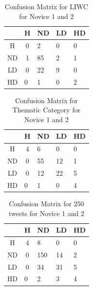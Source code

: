 \documentclass[11pt]{article}
\begin{document}
\begin{table}[h]
\centering
\begin{tabular}{c|c|l|l|l|}
\cline{2-5}
                         & H                       & ND & LD & HD \\ \hline
\multicolumn{1}{|c|}{H}  & 0                       & 2  & 0  & 0  \\ \hline
\multicolumn{1}{|c|}{ND} & 1                       & 85 & 2  & 1  \\ \hline
\multicolumn{1}{|c|}{LD} & 0                       & 22 & 9  & 0  \\ \hline
\multicolumn{1}{|l}{HD}  & \multicolumn{1}{|l|}{0} & 1  & 0  & 2  \\ \hline
\end{tabular}
\caption {Confusion Matrix for LIWC for Novice 1 and 2}
\end{table}

\begin{table}[h]
\centering
\begin{tabular}{c|c|l|l|l|}
\cline{2-5}
                         & H                       & ND & LD & HD \\ \hline
\multicolumn{1}{|c|}{H}  & 4                       & 6  & 0  & 0  \\ \hline
\multicolumn{1}{|c|}{ND} & 0                       & 55 & 12 & 1  \\ \hline
\multicolumn{1}{|c|}{LD} & 0                       & 12 & 22 & 5  \\ \hline
\multicolumn{1}{|l}{HD}  & \multicolumn{1}{|l|}{0} & 1  & 0  & 4  \\ \hline
\end{tabular}
\caption {Confusion Matrix for Thematic Category for Novice 1 and 2}
\end{table}

\begin{table}[h]
\centering
\begin{tabular}{c|c|l|l|l|}
\cline{2-5}
                         & H                       & ND  & LD & HD \\ \hline
\multicolumn{1}{|c|}{H}  & 4                       & 8   & 0  & 0  \\ \hline
\multicolumn{1}{|c|}{ND} & 0                       & 150 & 14 & 2  \\ \hline
\multicolumn{1}{|c|}{LD} & 0                       & 34  & 31 & 5  \\ \hline
\multicolumn{1}{|l}{HD}  & \multicolumn{1}{|l|}{0} & 2   & 3  & 4  \\ \hline
\end{tabular}
\caption {Confusion Matrix for 250 tweets for Novice 1 and 2}
\end{table}
\end{document}
